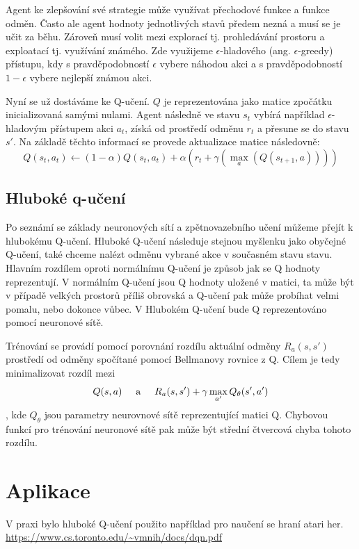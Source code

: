 Agent ke zlepšování své strategie může využívat přechodové funkce a funkce odměn. Často ale agent hodnoty jednotlivých stavů předem nezná a musí se je učit za běhu.
Zároveň musí volit mezi explorací tj. prohledávání prostoru a exploatací tj. využívání známého. Zde využijeme $\epsilon$-hladového (ang. $\epsilon$-greedy) přístupu, kdy s pravděpodobností $\epsilon$ vybere náhodou akci a s pravděpodobností $1-\epsilon$ vybere nejlepší známou akci.

Nyní se už dostáváme ke Q-učení. $Q$ je reprezentována jako matice zpočátku inicializovaná samými nulami. Agent následně ve stavu $s_t$ vybírá například $\epsilon$-hladovým přístupem akci $a_t$, získá od prostředí odměnu $r_t$ a přesune se do stavu $s'$.
Na základě těchto informací se provede aktualizace matice následovně:
\newline
\[Q(s_t,a_t) \leftarrow (1-\alpha)Q(s_t,a_t) + \alpha(r_t + \gamma(\max_a(Q(s_{t+1},a))))\]


\subsection{Hluboké q-učení}
Po seznámí se základy neuronových sítí a zpětnovazebního učení můžeme přejít k hlubokému Q-učení.
Hluboké Q-učení následuje stejnou myšlenku jako obyčejné Q-učení, také chceme nalézt odměnu vybrané akce v současném stavu stavu.
Hlavním rozdílem oproti normálnímu Q-učení je způsob jak se Q hodnoty reprezentují. V normálním Q-učení jsou Q hodnoty uložené v matici, ta může být v případě velkých prostorů příliš obrovská a Q-učení pak může probíhat velmi pomalu, nebo dokonce vůbec.
V Hlubokém Q-učení bude Q reprezentováno pomocí neuronové sítě.

Trénování se provádí pomocí porovnání rozdílu aktuální odměny $R_a(s,s')$ prostředí od odměny spočítané pomocí Bellmanovy rovnice z Q.
Cílem je tedy minimalizovat rozdíl mezi \[Q(s,a) \hspace{5mm}\text{a}\hspace{5mm}  R_a(s,s') + \gamma\max_{a'}Q_{\theta}(s',a')\], kde $Q_{\theta}$ jsou parametry neurovnové sítě reprezentující matici Q.
Chybovou funkcí pro trénování neuronové sítě pak může být střední čtvercová chyba tohoto rozdílu.

\section{Aplikace}
V praxi bylo hluboké Q-učení použito například pro naučení se hraní atari her. 
\url{https://www.cs.toronto.edu/~vmnih/docs/dqn.pdf}

